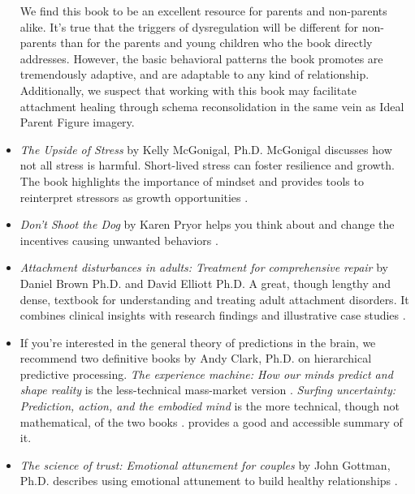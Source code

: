 \documentclass[12pt,letterpaper]{book}
\begin{document}
\begin{itemize}
    We find this book to be an excellent resource for parents and non-parents alike. It's true that the triggers of dysregulation will be different for non-parents than for the parents and young children who the book directly addresses. However, the basic behavioral patterns the book promotes are tremendously adaptive, and are adaptable to any kind of relationship. Additionally, we suspect that working with this book may facilitate attachment healing through schema reconsolidation in the same vein as Ideal Parent Figure imagery.
    \item \textit{The Upside of Stress} by Kelly McGonigal, Ph.D. McGonigal discusses how not all stress is harmful. Short-lived stress can foster resilience and growth. The book highlights the importance of mindset and provides tools to reinterpret stressors as growth opportunities \cite{mcgonigalStress}.
    \item \textit{Don't Shoot the Dog} by Karen Pryor helps you think about and change the incentives causing unwanted behaviors \cite{pryorDog}.
    \item \textit{Attachment disturbances in adults: Treatment for comprehensive repair} by Daniel Brown Ph.D. and David Elliott Ph.D. A great, though lengthy and dense, textbook for understanding and treating adult attachment disorders. It combines clinical insights with research findings and illustrative case studies \cite{brownAttachmentDisturbances}.
    \item If you're interested in the general theory of predictions in the brain, we recommend two definitive books by Andy Clark, Ph.D. on hierarchical predictive processing. \textit{The experience machine: How our minds predict and shape reality} is the less-technical mass-market version \cite{clark2024experience}. \textit{Surfing uncertainty: Prediction, action, and the embodied mind} is the more technical, though not mathematical, of the two books \cite{clark2015surfing}. \textcite{alexanderSurfing} provides a good and accessible summary of it.
    \item \textit{The science of trust: Emotional attunement for couples} by John Gottman, Ph.D. describes using emotional attunement to build healthy relationships \cite{gottmanTrust}.
\end{itemize}
\end{document}
